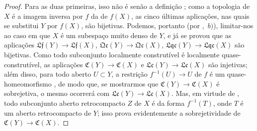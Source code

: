 \begin{proof}
Para as duas primeiras, isso não é senão a definição ; como a topologia de $X$ é a imagem inversa por $f$ da de $f(X)$, as cinco últimas aplicações, nas quais se substitui $Y$ por $f(X)$, são bijetivas.
Podemos, portanto (por ,~$b)$), limitar-nos ao caso em que $X$ é um subespaço muito denso de $Y$, e já se provou  que as aplicações $\mathfrak{Lf}(Y)\to\mathfrak{Lf}(X)$, $\mathfrak{Qc}(Y)\to\mathfrak{Qc}(X)$, $\mathfrak{Lqc}(Y)\to\mathfrak{Lqc}(X)$ são bijetivas.
Como todo subconjunto localmente construtível é localmente quase-construtível, as aplicações $\mathfrak{C}(Y)\to\mathfrak{C}(X)$ e $\mathfrak{Lc}(Y)\to\mathfrak{Lc}(X)$ são injetivas; além disso, para todo aberto $U\subset Y$, a restrição $f^{-1}(U)\to U$ de $f$ é um quase-homeomorfismo , de modo que, se mostrarmos que $\mathfrak{C}(Y)\to\mathfrak{C}(X)$ é sobrejetiva, o mesmo ocorrerá com $\mathfrak{Lc}(Y)\to\mathfrak{Lc}(X)$.
Mas, em virtude de , todo subconjunto aberto retrocompacto $Z$ de $X$ é da forma $f^{-1}(T)$, onde $T$ é um aberto retrocompacto de $Y$; isso prova evidentemente a sobrejetividade de $\mathfrak{C}(Y)\to\mathfrak{C}(X)$.
\end{proof}

